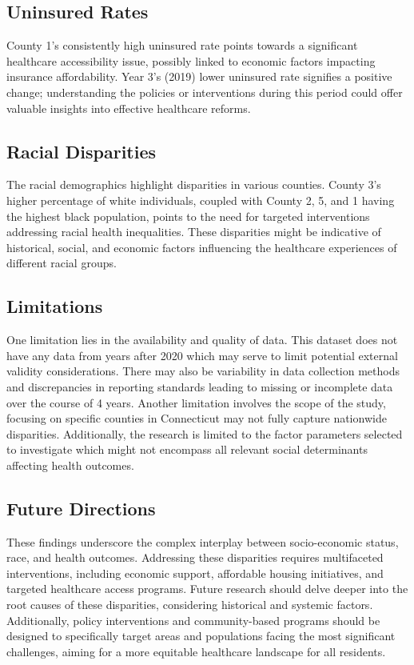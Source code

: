 \documentclass[12pt]{article}
\begin{document}
\subsection{Uninsured Rates}
County 1's consistently high uninsured rate points towards a significant healthcare accessibility issue, 
possibly linked to economic factors impacting insurance affordability. Year 3's (2019) lower uninsured rate signifies 
a positive change; understanding the policies or interventions during this period could offer valuable insights into 
effective healthcare reforms.

\subsection{Racial Disparities}
The racial demographics highlight disparities in various counties. County 3's higher percentage of white 
individuals, coupled with County 2, 5, and 1 having the highest black population, points to the need for
targeted interventions addressing racial health inequalities. These disparities might be indicative of 
historical, social, and economic factors influencing the healthcare experiences of different racial groups.

\subsection{Limitations}
One limitation lies in the availability and quality of data. This dataset does not have any 
data from years after 2020 which may serve to limit potential external validity considerations. 
There may also be variability in data collection methods and discrepancies in reporting standards 
leading to missing or incomplete data over the course of 4 years. Another limitation involves the scope 
of the study, focusing on specific counties in Connecticut may not fully capture nationwide disparities. 
Additionally, the research is limited to the factor parameters selected to investigate which  might not 
encompass all relevant social determinants affecting health outcomes.

\subsection{Future Directions}
These findings underscore the complex interplay between socio-economic status, race, and health outcomes. Addressing these disparities requires multifaceted interventions, including economic support, affordable housing initiatives, and targeted healthcare access programs. Future research should delve deeper into the root causes of these disparities, considering historical and systemic factors. Additionally, policy interventions and community-based programs should be designed to specifically target areas and populations facing the most significant challenges, aiming for a more equitable healthcare landscape for all residents.




\appendix



\end{document}
